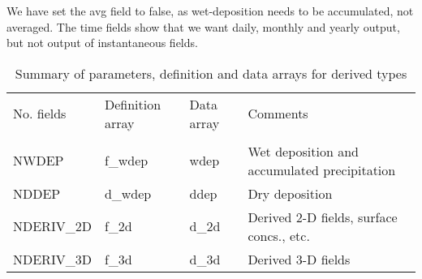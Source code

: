    We have set the avg field to false, as wet-deposition needs to be accumulated,
   not averaged. The time fields show that we want daily, monthly and yearly
   output, but not output of instantaneous fields.

   \begin{table}[h]
   \caption{Summary of parameters, definition and data arrays for derived types}
   \label{TABDRV}
   \begin{tabular}{|lllp{6cm}|}\hline
     No. fields    &  Definition array & Data array  & Comments  \\
                   &               &                 &           \\
     NWDEP         &    f\_wdep    &    wdep   & Wet deposition and accumulated precipitation  \\
     NDDEP         &    d\_wdep    &    ddep   & Dry deposition   \\
     NDERIV\_2D     &    f\_2d      &    d\_2d   & Derived 2-D fields, surface concs., etc.  \\
     NDERIV\_3D     &    f\_3d      &    d\_3d   & Derived 3-D fields  \\ \hline
   \end{tabular}
   \end{table}
